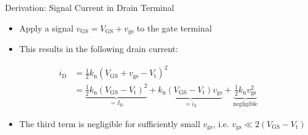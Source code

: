 \begin{frame}{Derivation: Signal Current in Drain Terminal}
    \begin{itemize}
        \item Apply a signal $v_{\mathrm{GS}}=V_{\mathrm{GS}}+v_{\mathrm{gs}}$ to the gate terminal
        \item This results in the following drain current:
    \end{itemize}
    \begin{align*}
        i_{\mathrm{D}}&=\frac{1}{2}k_{\mathrm{n}}(V_{\mathrm{GS}}+v_{\mathrm{gs}}
        -V_{\mathrm{t}})^{2} \\
        &=\underbrace{ \frac{1}{2}k_{\mathrm{n}}(V_{\mathrm{GS}}-V_{\mathrm{t}})^{2} }_{ =I_{\mathrm{D}}}
        +\underbrace{k_{\mathrm{n}}(V_{\mathrm{GS}}-V_{\mathrm{t}})v_{\mathrm{gs}}}_{=i_{\mathrm{d}}}
        +\underbrace{\frac{1}{2}k_{\mathrm{n}}v_{\mathrm{gs}}^{2}}_{ \text{negligible} }
    \end{align*}
    \begin{itemize}
        \item The third term is negligible for sufficiently small $v_{\mathrm{gs}}$, i.e. 
        $v_{\mathrm{gs}}\ll 2(V_{\mathrm{GS}}-V_{\mathrm{t}})$
    \end{itemize}
\end{frame}

